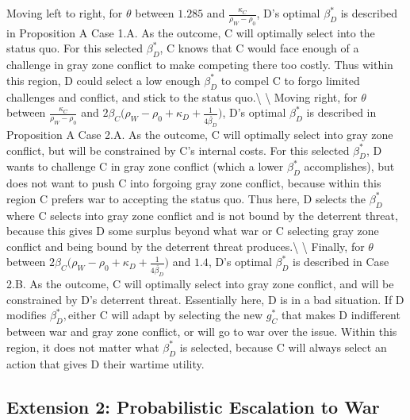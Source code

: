 \documentclass[
]{article}
\begin{document}
Moving left to right, for \(\theta\) between \(1.285\) and
\(\frac{\kappa_{C}}{\rho_{W}-\rho_{0}}\), D's optimal \(\beta_{D}^{*}\)
is described in Proposition A Case 1.A. As the outcome, C will optimally
select into the status quo. For this selected \(\beta_{D}^{*}\), C knows
that C would face enough of a challenge in gray zone conflict to make
competing there too costly. Thus within this region, D could select a
low enough \(\beta_{D}^{*}\) to compel C to forgo limited challenges and
conflict, and stick to the status quo.\textbackslash{} \textbackslash{}
Moving right, for \(\theta\) between
\(\frac{\kappa_{C}}{\rho_{W}-\rho_{0}}\) and
\(\ensuremath{2\beta_{C}(\rho_{W}-\ensuremath{\rho_{0}}+\kappa_{D}}+\frac{1}{4\check{\beta_{D}}})\),
D's optimal \(\beta_{D}^{*}\) is described in Proposition A Case 2.A. As
the outcome, C will optimally select into gray zone conflict, but will
be constrained by C's internal costs. For this selected
\(\beta_{D}^{*}\), D wants to challenge C in gray zone conflict (which a
lower \(\beta_{D}^{*}\) accomplishes), but does not want to push C into
forgoing gray zone conflict, because within this region C prefers war to
accepting the status quo. Thus here, D selects the \(\beta_{D}^{*}\)
where C selects into gray zone conflict and is not bound by the
deterrent threat, because this gives D some surplus beyond what war or C
selecting gray zone conflict and being bound by the deterrent threat
produces.\textbackslash{} \textbackslash{} Finally, for \(\theta\)
between
\(\ensuremath{2\beta_{C}(\rho_{W}-\ensuremath{\rho_{0}}+\kappa_{D}}+\frac{1}{4\check{\beta_{D}}})\)
and \(1.4\), D's optimal \(\beta_{D}^{*}\) is described in Case 2.B. As
the outcome, C will optimally select into gray zone conflict, and will
be constrained by D's deterrent threat. Essentially here, D is in a bad
situation. If D modifies \(\beta_{D}^{*},\)either C will adapt by
selecting the new \(g_{C}^{*}\) that makes D indifferent between war and
gray zone conflict, or will go to war over the issue. Within this
region, it does not matter what \(\beta_{D}^{*}\) is selected, because C
will always select an action that gives D their wartime utility.

\hypertarget{extension-2-probabilistic-escalation-to-war}{%
\subsection{Extension 2: Probabilistic Escalation to
War}\label{extension-2-probabilistic-escalation-to-war}}
\end{document}
